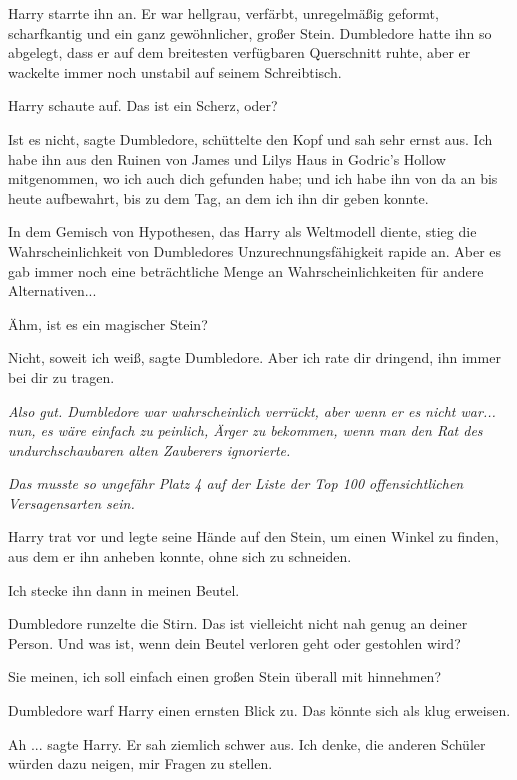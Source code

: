 Harry starrte ihn an. Er war hellgrau, verfärbt, unregelmäßig geformt,
scharfkantig und ein ganz gewöhnlicher, großer Stein. Dumbledore hatte ihn so
abgelegt, dass er auf dem breitesten verfügbaren Querschnitt ruhte, aber er
wackelte immer noch unstabil auf seinem Schreibtisch.

Harry schaute auf. \glqq Das ist ein Scherz, oder?\grqq{}

\glqq Ist es nicht\grqq{}, sagte Dumbledore, schüttelte den Kopf und sah sehr
ernst aus. \glqq Ich habe ihn aus den Ruinen von James und Lilys Haus in
Godric's Hollow mitgenommen, wo ich auch dich gefunden habe; und ich habe ihn
von da an bis heute aufbewahrt, bis zu dem Tag, an dem ich ihn dir geben
konnte.\grqq{}

In dem Gemisch von Hypothesen, das Harry als Weltmodell diente, stieg die
Wahrscheinlichkeit von Dumbledores Unzurechnungsfähigkeit rapide an. Aber es gab
immer noch eine beträchtliche Menge an Wahrscheinlichkeiten für andere
Alternativen...

\glqq Ähm, ist es ein magischer Stein?\grqq{}

\glqq Nicht, soweit ich weiß\grqq{}, sagte Dumbledore. \glqq Aber ich rate dir
dringend, ihn immer bei dir zu tragen.\grqq{}

\emph{Also gut. Dumbledore war wahrscheinlich verrückt, aber wenn er es nicht
war... nun, es wäre einfach zu }\emph{peinlich, Ärger zu bekommen, wenn man den
Rat des undurchschaubaren alten Zauberers ignorierte.}

\emph{Das musste so ungefähr Platz 4 auf der Liste der Top 100 offensichtlichen
Versagensarten sein.}

Harry trat vor und legte seine Hände auf den Stein, um einen Winkel zu finden,
aus dem er ihn anheben konnte, ohne sich zu schneiden.

\glqq Ich stecke ihn dann in meinen Beutel.\grqq{}

Dumbledore runzelte die Stirn. \glqq Das ist vielleicht nicht nah genug an
deiner Person. Und was ist, wenn dein Beutel verloren geht oder gestohlen
wird?\grqq{}

\glqq Sie meinen, ich soll einfach einen großen Stein überall mit
hinnehmen?\grqq{}

Dumbledore warf Harry einen ernsten Blick zu. \glqq Das könnte sich als klug
erweisen.\grqq{}

\glqq Ah ...\grqq{} sagte Harry. Er sah ziemlich schwer aus. \glqq Ich denke,
die anderen Schüler würden dazu neigen, mir Fragen zu stellen.\grqq{}

